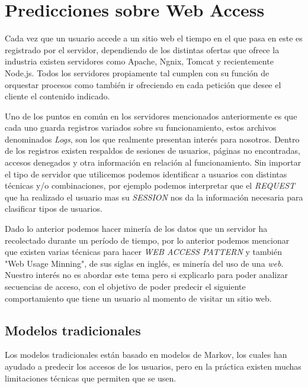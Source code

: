 \chapter[Predicciones sobre Web Access]{Predicciones sobre Web Access}
\label{ch:tema}


Cada vez que un usuario accede a un sitio web el tiempo en el que pasa en este es registrado
por el servidor, dependiendo de los distintas ofertas que ofrece la industria existen servidores como Apache, Ngnix, Tomcat
y recientemente Node.js. Todos los servidores propiamente tal cumplen con su función de orquestar procesos
como también ir ofreciendo en cada petición que desee el cliente el contenido indicado.



Uno de los puntos en común en los servidores mencionados anteriormente es que cada uno guarda registros variados sobre su funcionamiento,
estos archivos denominados \emph{Logs}, son los que realmente presentan interés para nosotros. Dentro de los registros existen respaldos de sesiones de usuarios, páginas no encontradas, accesos denegados y otra información en relación al funcionamiento. Sin importar el tipo de servidor que utilicemos podemos identificar a usuarios con distintas técnicas y/o combinaciones, por ejemplo podemos interpretar que el \emph{REQUEST} que ha realizado el usuario mas su \emph{SESSION} nos da la información necesaria para clasificar tipos de usuarios.

Dado lo anterior podemos hacer minería de los datos que un servidor ha recolectado durante un período de tiempo, por lo anterior  podemos mencionar que existen varias
técnicas para  hacer \emph{WEB ACCESS PATTERN } y también  "Web Usage Minning", de sus siglas en inglés, es minería del uso de una \emph{web}. Nuestro interés no es abordar este tema pero si explicarlo para poder analizar secuencias de acceso, con el objetivo de poder predecir el siguiente comportamiento que tiene un usuario al momento de visitar un sitio web.





\section{Modelos tradicionales}
 
Los modelos tradicionales están basado en modelos de Markov, los cuales han ayudado a predecir los accesos de los usuarios, pero en la práctica existen 
muchas limitaciones técnicas que permiten que se usen. 

